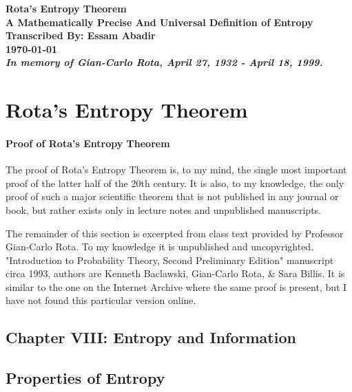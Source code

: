\documentclass{report}
\begin{document}
\begin{titlepage}
    \centering
    \vspace*{\fill}
    \Huge\bfseries Rota's Entropy Theorem\\
    \Large A Mathematically Precise And Universal Definition of Entropy\\
    \vspace{1cm}
    \Large Transcribed By: Essam Abadir\\
    \vspace{1cm}
    \large \today\\

    \vspace{3cm}
    \normalfont \emph{In memory of Gian-Carlo Rota, April 27, 1932 - April 18, 1999.}
    \vspace*{\fill}
\end{titlepage}

\section*{Rota's Entropy Theorem}

\paragraph{Proof of Rota's Entropy Theorem}
The proof of Rota's Entropy Theorem is, to my mind, the single most important proof of the latter half of the 20th century. It is also, to my knowledge, the only proof of such a major scientific theorem that is not published in any journal or book, but rather exists only in lecture notes and unpublished manuscripts.

The remainder of this section is excerpted from class text provided by Professor Gian-Carlo Rota. To my knowledge it is unpublished and uncopyrighted. "Introduction to Probability Theory, Second Preliminary Edition" manuscript circa 1993, authors are Kenneth Baclawski, Gian-Carlo Rota, \& Sara Billis. It is similar to the one on the Internet Archive\cite{RotaBaclawski} where the same proof is present, but I have not found this particular version online. 
\medskip
\medskip

\subsection*{Chapter VIII: Entropy and Information}
\normalsize
\subsection*{Properties of Entropy}
\end{document}
